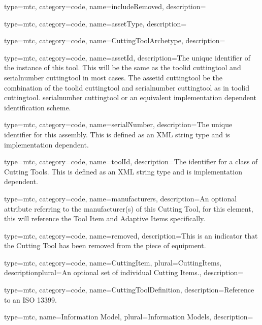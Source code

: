 {
  type=mtc,
  category=code,
  name={includeRemoved},
  description={}
}


{
  type=mtc,
  category=code,
  name={assetType},
  description={}
}


{
  type=mtc,
  category=code,
  name={CuttingToolArchetype},
  description={}
}


{
  type=mtc,
  category=code,
  name={assetId},
  description={The unique identifier of the instance of this tool. This will be the same as the \gls{toolid cuttingtool} and \gls{serialnumber cuttingtool} in most cases. The \gls{assetid cuttingtool} \SHOULD be the combination of the \gls{toolid cuttingtool} and \gls{serialnumber cuttingtool} as in \gls{toolid cuttingtool}. \gls{serialnumber cuttingtool} or an equivalent implementation dependent identification scheme.}
}


{
  type=mtc,
  category=code,
  name={serialNumber},
  description={The unique identifier for this assembly. This is defined as an XML string type and is implementation dependent.}
}


{
  type=mtc,
  category=code,
  name={toolId},
  description={The identifier for a class of Cutting Tools. This is defined as an XML string type and is implementation dependent. }
}


{
  type=mtc,
  category=code,
  name={manufacturers},
  description={An optional attribute referring to the manufacturer(s) of this Cutting Tool, for this element, this will reference the Tool Item and Adaptive Items specifically. }
}


{
  type=mtc,
  category=code,
  name={removed},
  description={This is an indicator that the Cutting Tool has been removed from the piece of equipment. }
}


{
  type=mtc,
  category=code,
  name={CuttingItem},
  plural={CuttingItems},
  descriptionplural={An optional set of individual Cutting Items.},
  description={}
}


{
  type=mtc,
  category=code,
  name={CuttingToolDefinition},
  description={Reference to an ISO 13399.}
}


{
  type=mtc,
  name={Information Model},
  plural={Information Models},
  description={}
}


